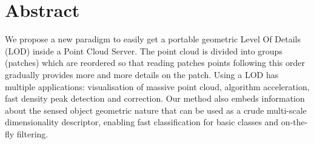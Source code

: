  
\section{Abstract}
	We propose a new paradigm to easily get a portable geometric Level Of Details (LOD) inside a Point Cloud Server.
	The point cloud is divided into groups (patches) which are reordered so that reading patches points following this order gradually provides more and more details on the patch.
	Using a LOD has multiple applications: visualisation of massive point cloud, algorithm acceleration,
	 fast density peak detection and correction.
	Our method also embeds information about the sensed object geometric nature that can be used as a crude multi-scale dimensionality descriptor,
	enabling fast classification for basic classes and on-the-fly filtering. 
	 
	